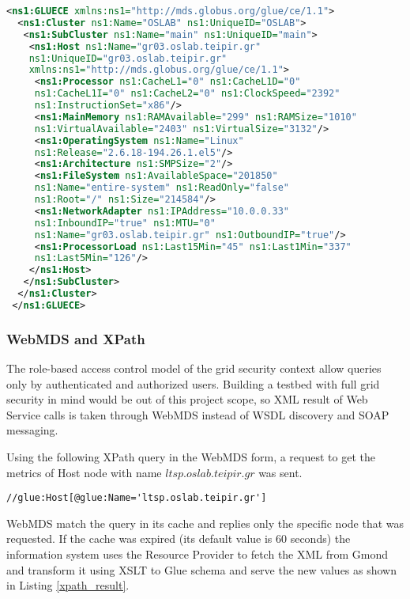 \begin{lstlisting}[language=XML,caption=WSRF query output,label=wsrfquery]
 <ns1:GLUECE xmlns:ns1="http://mds.globus.org/glue/ce/1.1">
  <ns1:Cluster ns1:Name="OSLAB" ns1:UniqueID="OSLAB">
   <ns1:SubCluster ns1:Name="main" ns1:UniqueID="main">
    <ns1:Host ns1:Name="gr03.oslab.teipir.gr" 
    ns1:UniqueID="gr03.oslab.teipir.gr" 
    xmlns:ns1="http://mds.globus.org/glue/ce/1.1">
     <ns1:Processor ns1:CacheL1="0" ns1:CacheL1D="0" 
     ns1:CacheL1I="0" ns1:CacheL2="0" ns1:ClockSpeed="2392" 
     ns1:InstructionSet="x86"/>
     <ns1:MainMemory ns1:RAMAvailable="299" ns1:RAMSize="1010" 
     ns1:VirtualAvailable="2403" ns1:VirtualSize="3132"/>
     <ns1:OperatingSystem ns1:Name="Linux"
     ns1:Release="2.6.18-194.26.1.el5"/>
     <ns1:Architecture ns1:SMPSize="2"/>
     <ns1:FileSystem ns1:AvailableSpace="201850" 
     ns1:Name="entire-system" ns1:ReadOnly="false"
     ns1:Root="/" ns1:Size="214584"/>
     <ns1:NetworkAdapter ns1:IPAddress="10.0.0.33" 
     ns1:InboundIP="true" ns1:MTU="0" 
     ns1:Name="gr03.oslab.teipir.gr" ns1:OutboundIP="true"/>
     <ns1:ProcessorLoad ns1:Last15Min="45" ns1:Last1Min="337"
     ns1:Last5Min="126"/>
    </ns1:Host>
   </ns1:SubCluster>
  </ns1:Cluster>
 </ns1:GLUECE>
\end{lstlisting}

\subsubsection{WebMDS and XPath}

The role-based access control model of the grid security context allow queries only by authenticated and authorized users. Building a testbed with full grid security in mind would be out of this project scope, so XML result of Web Service calls is taken through WebMDS instead of WSDL discovery and SOAP messaging.

Using the following XPath query in the WebMDS form, a request to get the metrics of Host node with name $ltsp.oslab.teipir.gr$ was sent.

\begin{verbatim}
//glue:Host[@glue:Name='ltsp.oslab.teipir.gr']
\end{verbatim}

WebMDS match the query in its cache and replies only the specific node that was requested. If the cache was expired (its default value is 60 seconds) the information system uses the Resource Provider to fetch the XML from Gmond and transform it using XSLT to Glue schema and serve the new values as shown in Listing \ref{xpath_result}.

